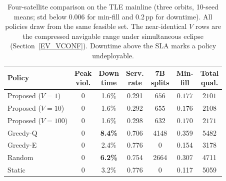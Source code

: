 \begin{table}[!t]
\centering\footnotesize
\setlength{\tabcolsep}{3pt}
\caption{\label{tab_split}Four-satellite comparison on the TLE mainline (three
orbits, 10-seed means; std below 0.006 for min-fill and 0.2\,pp for downtime).
All policies draw from the same feasible set. The near-identical $V$ rows are
the compressed navigable range under simultaneous eclipse
(Section~\ref{EV_VCONF}). Downtime above the SLA marks a policy undeployable.}
\begin{tabular}{lcccccc}
\toprule
Policy & \makecell{Peak\\viol.} & \makecell{Down\\time} & \makecell{Serv.\\rate} & \makecell{7B\\splits} & \makecell{Min-\\fill} & \makecell{Total\\qual.} \\
\midrule
Proposed ($V{=}1$)   & 0 & 1.6\% & 0.291 & $656$ & $\mathbf{0.177}$ & $2101$ \\
Proposed ($V{=}10$)  & 0 & 1.6\% & 0.292 & $655$ & $0.176$ & $2108$ \\
Proposed ($V{=}100$) & 0 & 1.6\% & 0.298 & $632$ & $0.170$ & $2171$ \\
\midrule
Greedy-Q & 0 & \textbf{8.4\%} & 0.706 & 4148 & 0.359 & 5482 \\
Greedy-E & 0 & 2.4\% & 0.776 & 0 & 0.154 & 3178 \\
Random   & 0 & \textbf{6.2\%} & 0.754 & 2664 & 0.307 & 4711 \\
Static   & 0 & 3.2\% & 0.776 & 0 & 0.117 & 5059 \\
\bottomrule
\end{tabular}
\end{table}

